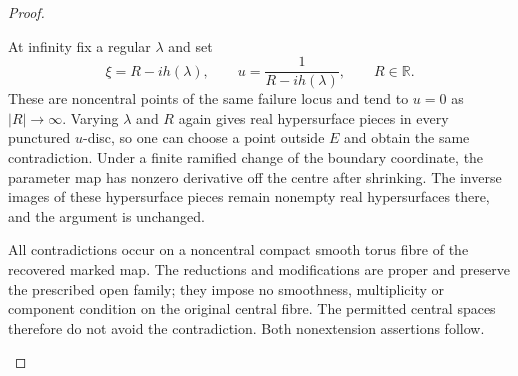 \documentclass[11pt,a4paper]{article}
\theoremstyle{definition}
\begin{document}
\begin{proof}
\begin{enumerate}[label=\arabic*.]
At infinity fix a regular $\lambda$ and set
\[
 \xi=R-i h(\lambda),\qquad
 u=\frac1{R-i h(\lambda)},\qquad R\in\mathbb R.
\]
These are noncentral points of the same failure locus and
tend to $u=0$ as $|R|\to\infty$.  Varying $\lambda$ and $R$
again gives real hypersurface pieces in every punctured
$u$-disc, so one can choose a point outside $E$ and obtain the
same contradiction.  Under a finite ramified change of the
boundary coordinate, the parameter map has nonzero derivative
off the centre after shrinking.  The inverse images of these
hypersurface pieces remain nonempty real hypersurfaces there,
and the argument is unchanged.

All contradictions occur on a noncentral compact smooth
torus fibre of the recovered marked map.  The reductions and
modifications are proper and preserve the prescribed open
family; they impose no smoothness, multiplicity or component
condition on the original central fibre.  The permitted
central spaces therefore do not avoid the contradiction.
Both nonextension assertions follow.
\end{enumerate}
\end{proof}
\end{document}
